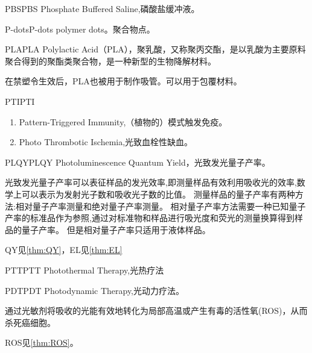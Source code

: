 \documentclass[cn,11pt,chinese]{elegantbook}
\begin{document}
\begin{theorem}{PBS}{PBS}
  Phosphate Buffered Saline,磷酸盐缓冲液。
  \end{theorem}

\begin{theorem}{P-dots}{P-dots}
    polymer dots。聚合物点。
\end{theorem}

\begin{theorem}{PLA}{PLA}
  Polylactic Acid（PLA），聚乳酸，又称聚丙交酯，是以乳酸为主要原料聚合得到的聚酯类聚合物，是一种新型的生物降解材料。

  在禁塑令生效后，PLA也被用于制作吸管。可以用于包覆材料。
  \end{theorem}

  \begin{theorem}{PTI}{PTI}
    \begin{enumerate}
      \item Pattern-Triggered Immunity,（植物的）模式触发免疫。
      \item Photo Thrombotic Ischemia,光致血栓性缺血。
    \end{enumerate}
    
\end{theorem}

\begin{theorem}{PLQY}{PLQY}
Photoluminescence Quantum Yield，光致发光量子产率。

光致发光量子产率可以表征样品的发光效率,即测量样品有效利用吸收光的效率,数学上可以表示为发射光子数和吸收光子数的比值。
测量样品的量子产率有两种方法:相对量子产率测量和绝对量子产率测量。
相对量子产率方法需要一种已知量子产率的标准品作为参照,通过对标准物和样品进行吸光度和荧光的测量换算得到样品的量子产率。
但是相对量子产率只适用于液体样品。
\end{theorem}

\begin{note}
QY见\vref{thm:QY}，EL见\vref{thm:EL}
\end{note}


\begin{theorem}{PTT}{PTT}
  Photothermal Therapy,光热疗法
\end{theorem}

\begin{theorem}{PDT}{PDT}
  Photodynamic Therapy,光动力疗法。

  通过光敏剂将吸收的光能有效地转化为局部高温或产生有毒的活性氧(ROS)，从而杀死癌细胞。
\end{theorem}
\begin{note}
  ROS见\vref{thm:ROS}。
\end{note}
\end{document}
